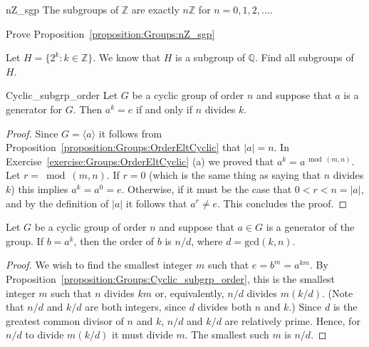  
\begin{prop}{nZ_sgp}
The subgroups of ${\mathbb Z}$ are exactly $n{\mathbb Z}$ for $n = 0, 1, 2,
\ldots$. 
\end{prop}

\begin{exercise}{}
Prove Proposition~\ref{proposition:Groups:nZ_sgp}
\end{exercise}

\begin{exercise}{}
Let $H = \{2^k : k \in {\mathbb Z} \}$. We know that $H$ is a subgroup of $\mathbb{Q}$.  Find all subgroups of $H$. 
\end{exercise}
 
 
\begin{prop}{Cyclic_subgrp_order}
Let $G$ be a cyclic group of order $n$ and suppose that $a$ is a
generator for  $G$. Then $a^k=e$ if and only if $n$ divides $k$.
\end{prop}
 
 
\begin{proof}
Since $G=\langle a \rangle$ it follows from Proposition~\ref{proposition:Groups:OrderEltCyclic} that $|a|=n$. In Exercise~\ref{exercise:Groups:OrderEltCyclic} (a) we proved that  $a^k =  a^{\bmod(m,n)}$. Let $r =\bmod(m,n)$.  If $r=0$ (which is the same thing as saying that $n$ divides $k$) this implies $a^k =  a^{0} = e$. Otherwise, if it must be the case that $0< r< n=|a|$, and by the definition of $|a|$ it follows that $a^r \neq e$. This concludes the proof.
\end{proof}

\begin{prop}{}
Let $G$ be a cyclic group of order $n$ and suppose that $a \in G$ is a
generator of the group.  If $b = a^k$, then the order of $b$ is $n
/d$, where $d = \text{gcd}(k,n)$. 
\end{prop}
 
 
\begin{proof}
We wish to find the smallest integer $m$ such that $e = b^m = a^{km}$.
By Proposition~\ref{proposition:Groups:Cyclic_subgrp_order}, this is the smallest integer $m$ such that
$n$ divides $km$ or, equivalently, $n/d$ divides $m(k/d)$. (Note that $n/d$ and $k/d$ are both integers, since $d$ divides both $n$ and $k$.)  Since $d$ is
the greatest common divisor of $n$ and $k$, $n/d$ and $k/d$ are
relatively prime. Hence, for $n/d$ to divide $m(k/d)$ it must divide
$m$.  The smallest such $m$ is $n/d$. 
\end{proof}
 
